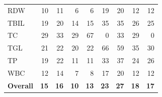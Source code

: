 \begin{table}[ht]
\begin{tabular}{lrrrrrrrr}
RDW & 10 & 11 & 6 & 6 & 19 & 20 & 12 & 12 \\
TBIL & 19 & 20 & 14 & 15 & 35 & 35 & 26 & 25 \\
TC & 29 & 33 & 29 & 67 & 0 & 33 & 29 & 0 \\
TGL & 21 & 22 & 20 & 22 & 66 & 59 & 35 & 30 \\
TP & 19 & 22 & 11 & 11 & 33 & 37 & 24 & 26 \\
WBC & 12 & 14 & 7 & 8 & 17 & 20 & 12 & 12 \\
\midrule
\textbf{Overall} & \textbf{15} & \textbf{16} & \textbf{10} & \textbf{13} & \textbf{23} & \textbf{27} & \textbf{18} & \textbf{17} \\
\bottomrule
\end{tabular}
\label{tab:eicu_eval_interpret}
\end{table}